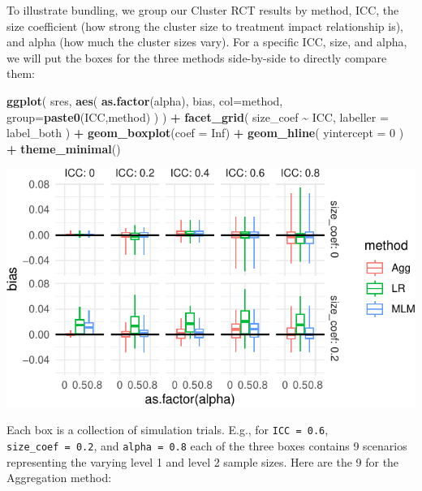 \documentclass[
]{book}
\newenvironment{Shaded}{\begin{snugshade}}{\end{snugshade}}
\newcommand{\AttributeTok}[1]{\textcolor[rgb]{0.13,0.29,0.53}{#1}}
\newcommand{\ConstantTok}[1]{\textcolor[rgb]{0.56,0.35,0.01}{#1}}
\newcommand{\DecValTok}[1]{\textcolor[rgb]{0.00,0.00,0.81}{#1}}
\newcommand{\FunctionTok}[1]{\textcolor[rgb]{0.13,0.29,0.53}{\textbf{#1}}}
\newcommand{\NormalTok}[1]{#1}
\newcommand{\SpecialCharTok}[1]{\textcolor[rgb]{0.81,0.36,0.00}{\textbf{#1}}}
\begin{document}
To illustrate bundling, we group our Cluster RCT results by method, ICC, the size coefficient (how strong the cluster size to treatment impact relationship is), and alpha (how much the cluster sizes vary).
For a specific ICC, size, and alpha, we will put the boxes for the three methods side-by-side to directly compare them:

\begin{Shaded}
\begin{Highlighting}[]
\FunctionTok{ggplot}\NormalTok{( sres, }\FunctionTok{aes}\NormalTok{( }\FunctionTok{as.factor}\NormalTok{(alpha), bias, }\AttributeTok{col=}\NormalTok{method, }\AttributeTok{group=}\FunctionTok{paste0}\NormalTok{(ICC,method) ) ) }\SpecialCharTok{+}
  \FunctionTok{facet\_grid}\NormalTok{( size\_coef }\SpecialCharTok{\textasciitilde{}}\NormalTok{ ICC, }\AttributeTok{labeller =}\NormalTok{ label\_both ) }\SpecialCharTok{+}
  \FunctionTok{geom\_boxplot}\NormalTok{(}\AttributeTok{coef =} \ConstantTok{Inf}\NormalTok{) }\SpecialCharTok{+}
  \FunctionTok{geom\_hline}\NormalTok{( }\AttributeTok{yintercept =} \DecValTok{0}\NormalTok{ ) }\SpecialCharTok{+}
  \FunctionTok{theme\_minimal}\NormalTok{() }
\end{Highlighting}
\end{Shaded}

\begin{center}\includegraphics[width=0.75\linewidth]{Designing-Simulations-in-R_files/figure-latex/clusterRCT_plot_bias_v1-1} \end{center}

Each box is a collection of simulation trials. E.g., for \texttt{ICC\ =\ 0.6}, \texttt{size\_coef\ =\ 0.2}, and \texttt{alpha\ =\ 0.8} each of the three boxes contains 9 scenarios representing the varying level 1 and level 2 sample sizes.
Here are the 9 for the Aggregation method:
\end{document}

